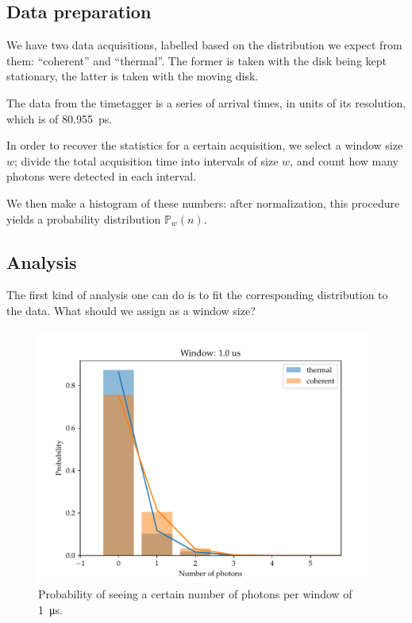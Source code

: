 \documentclass[main.tex]{subfiles}
\begin{document}
\subsection{Data preparation}

We have two data acquisitions, labelled based on the distribution we expect from them: ``coherent'' and ``thermal''. 
The former is taken with the disk being kept stationary, the latter is taken with the moving disk. 

The data from the timetagger is a series of arrival times, in units of its resolution, which is of \SI{80.955}{ps}. 

In order to recover the statistics for a certain acquisition, we select a window size \(w\); divide the total acquisition time into intervals of size \(w\), and count how many photons were detected in each interval.

We then make a histogram of these numbers: after normalization, this procedure yields a probability distribution \(\mathbb{P}_w(n)\).

\subsection{Analysis}

The first kind of analysis one can do is to fit the corresponding distribution to the data. What should we assign as a window size? 

\begin{figure}[ht]
\centering
\includegraphics[width=\textwidth]{figures/1.0us}
\caption{Probability of seeing a certain number of photons per window of \SI{1}{\micro s}.}
\label{fig:1.0us}
\end{figure}
\end{document}
